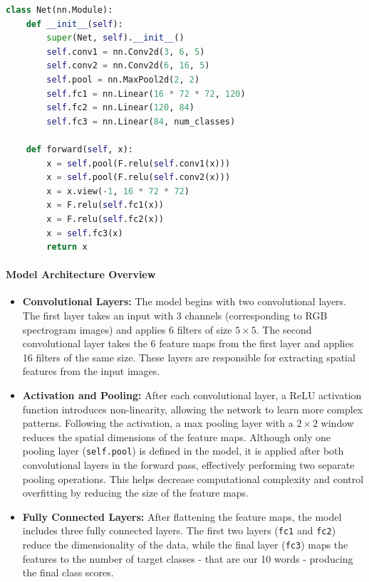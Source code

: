 \documentclass[12pt]{article}
\begin{document}
\begin{lstlisting}[language=Python, caption=CNN Model Architecture]
class Net(nn.Module):
    def __init__(self):
        super(Net, self).__init__()
        self.conv1 = nn.Conv2d(3, 6, 5)
        self.conv2 = nn.Conv2d(6, 16, 5)
        self.pool = nn.MaxPool2d(2, 2)
        self.fc1 = nn.Linear(16 * 72 * 72, 120)
        self.fc2 = nn.Linear(120, 84)
        self.fc3 = nn.Linear(84, num_classes)

    def forward(self, x):
        x = self.pool(F.relu(self.conv1(x)))
        x = self.pool(F.relu(self.conv2(x)))
        x = x.view(-1, 16 * 72 * 72)
        x = F.relu(self.fc1(x))
        x = F.relu(self.fc2(x))
        x = self.fc3(x)
        return x
\end{lstlisting}

\paragraph{Model Architecture Overview}

\begin{itemize}
    \item \textbf{Convolutional Layers:} The model begins with two convolutional layers. The first layer takes an input with 3 channels (corresponding to RGB spectrogram images) and applies 6 filters of size \(5 \times 5\). The second convolutional layer takes the 6 feature maps from the first layer and applies 16 filters of the same size. These layers are responsible for extracting spatial features from the input images.
    
    \item \textbf{Activation and Pooling:} After each convolutional layer, a ReLU activation function introduces non-linearity, allowing the network to learn more complex patterns. Following the activation, a max pooling layer with a \(2 \times 2\) window reduces the spatial dimensions of the feature maps. Although only one pooling layer (\texttt{self.pool}) is defined in the model, it is applied after both convolutional layers in the forward pass, effectively performing two separate pooling operations. This helps decrease computational complexity and control overfitting by reducing the size of the feature maps.
    
    \item \textbf{Fully Connected Layers:} After flattening the feature maps, the model includes three fully connected layers. The first two layers (\texttt{fc1} and \texttt{fc2}) reduce the dimensionality of the data, while the final layer (\texttt{fc3}) maps the features to the number of target classes - that are our 10 words - producing the final class scores.
\end{itemize}
\end{document}
